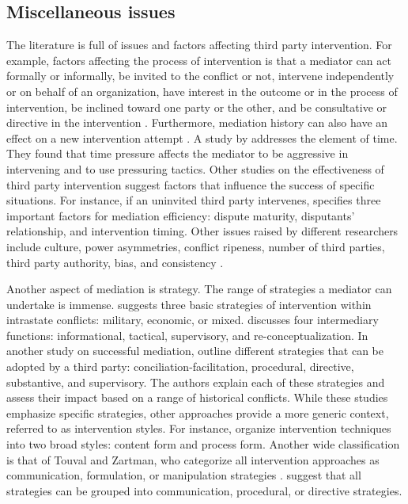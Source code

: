 \documentclass[letterpaper,12pt,titlepage,oneside,final]{book}
\begin{document}
\subsection{Miscellaneous issues}
\label{sec:miscissues}
The literature is full of issues and factors affecting third party intervention. For example, factors affecting the process of intervention is that a mediator can act formally or informally, be invited to the conflict or not, intervene independently or on behalf of an organization, have interest in the outcome or in the process of intervention, be inclined toward one party or the other, and be consultative or directive in the intervention \citep{lewicki1992}. Furthermore, mediation history can also have an effect on a new intervention attempt \citep{bercovitch2006}. A study by \citet{carnevale2005} addresses the element of time. They found that time pressure affects the mediator to be aggressive in intervening and to use pressuring tactics. Other studies on the effectiveness of third party intervention suggest factors that influence the success of specific situations. For instance, if an uninvited third party intervenes, \citet{murray1983} specifies three important factors for mediation efficiency: dispute maturity, disputants' relationship, and intervention timing. Other issues raised by different researchers include culture, power asymmetries, conflict ripeness, number of third parties, third party authority, bias, and consistency \citep{fisher2001}.

Another aspect of mediation is strategy. The range of strategies a mediator can undertake is immense. \citet{regan1996} suggests three basic strategies of intervention within intrastate conflicts: military, economic, or mixed. \citet{young1972} discusses four intermediary functions: informational, tactical, supervisory, and re-conceptualization. In another study on successful mediation, \citet{bercovitch1991} outline different strategies that can be adopted by a third party: conciliation-facilitation, procedural, directive, substantive, and supervisory. The authors explain each of these strategies and assess their impact based on a range of historical conflicts. While these studies emphasize specific strategies, other approaches provide a more generic context, referred to as intervention styles. For instance, \citet{bartunek1975} organize intervention techniques into two broad styles: content form and process form. Another wide classification is that of Touval and Zartman, who categorize all intervention approaches as communication, formulation, or manipulation strategies \citep{bercovitch1993}.  \citet{bercovitch2006} suggest that all strategies can be grouped into communication, procedural, or directive strategies.
\end{document}
